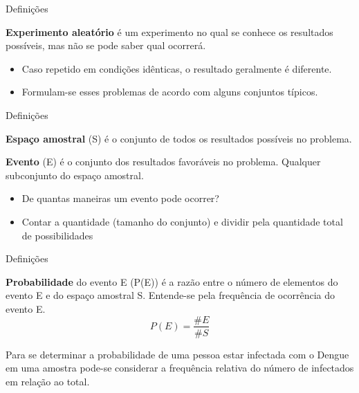\documentclass{beamer}
\begin{document}
\begin{frame}{Definições}
  \begin{definition}
    {\bf Experimento aleatório} é um experimento no qual se conhece os
    resultados possíveis, mas não se pode saber qual ocorrerá.
  \end{definition}

  \begin{itemize}
  \item Caso repetido em condições idênticas, o resultado geralmente é
    diferente.
  \item Formulam-se esses problemas de acordo com alguns conjuntos
    típicos.
  \end{itemize}

\end{frame}

\begin{frame}{Definições}
  \begin{definition}
    {\bf Espaço amostral} (S) é o conjunto de todos os resultados
    possíveis no problema.
  \end{definition}
  \begin{definition}
    {\bf Evento} (E) é o conjunto dos resultados favoráveis no
    problema. Qualquer subconjunto do espaço amostral.
  \end{definition}
  \begin{itemize}
  \item De quantas maneiras um evento pode ocorrer?
  \item Contar a quantidade (tamanho do conjunto) e dividir pela
    quantidade total de possibilidades
  \end{itemize}
\end{frame}

\begin{frame}{Definições}
  \begin{definition}
    {\bf Probabilidade} do evento E (P(E)) é a razão entre o número de
    elementos do evento E e do espaço amostral S. Entende-se pela
    \alert{frequência} de ocorrência do evento E.
    \begin{displaymath}
      P(E) = \frac{\#E}{\#S}
    \end{displaymath}
  \end{definition}
  \begin{example}
    Para se determinar a probabilidade de uma pessoa estar infectada
    com o Dengue em uma amostra pode-se considerar a frequência
    relativa do número de infectados em relação ao total.
  \end{example}
\end{frame}
\end{document}
